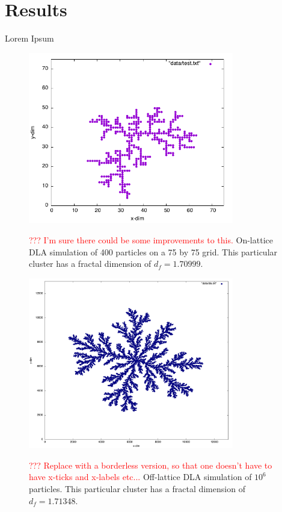 \section{Results}
Lorem Ipsum

\begin{figure}
	\begin{center}
		\includegraphics[width = 0.8\textwidth]{fig/on_lattice_400_p_75_g.png}
		\label{fig:2d-DLA_400}
		\caption{\textcolor{red}{??? I'm sure there could be some improvements to this.} On-lattice DLA simulation of 400 particles on a 75 by 75 grid.  This particular cluster has a fractal dimension of $d_f = 1.70999$.}
	\end{center}
\end{figure}

\begin{figure}
	\begin{center}
		\includegraphics[width = 0.8\textwidth]{fig/1_(1_71348).png}
		\label{fig:2d-DLA_1mill}
		\caption{\textcolor{red}{??? Replace with a borderless version, so that one doesn't have to have x-ticks and x-labels etc...} Off-lattice DLA simulation of $10^6$ particles. This particular cluster has a fractal dimension of $d_f = 1.71348$.}
	\end{center}
\end{figure}

